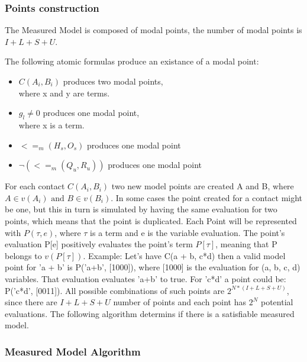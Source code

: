 \documentclass{article}
\begin{document}
		\subsubsection*{Points construction}
		The Measured Model is composed of modal points, the number of modal points is $I + L + S + U$.
		
		The following atomic formulas produce an existance of a modal point:
		\begin{itemize}
			\item $C(A_i, B_i)$ produces two modal points, \\
				where x and y are terms.
			\item $g_l \neq 0$ produces one modal point, \\
				where x is a term.
			\item $<=_m(H_s, O_s)$ produces one modal point
			\item $\neg (<=_m(Q_u, R_u) )$ produces one modal point
		\end{itemize}
		For each contact $C(A_i, B_i)$ two new model points are created A and B, where $A \in v(A_i) \text{ and } B \in v(B_i)$.
		In some cases the point created for a contact might be one, but this in turn is simulated by having the same evaluation for two 
		points, which means that the point is duplicated.
		\newline
		Each Point will be represented with $P(\tau , e)$, where $\tau$ is a term and e is the variable evaluation.
		The point's evaluation P[e] positively evaluates the point's term $P[\tau ]$, meaning that P belongs to $v(P[\tau ])$.
		\newline
		Example: Let's have C(a + b, c*d)
		\newline
		then a valid model point for 'a + b' is P('a+b', [1000]), where [1000] is the evaluation for (a, b, c, d) variables.
		That evaluation evaluates 'a+b' to true.
		\newline
		For 'c*d' a point could be: P('c*d', [0011]).
		\newline
		All possible combinations of such points are $2^{N * (I + L + S + U)}$, since there are $I + L + S + U$ number of points and 
		each point has $2^N$ potential evaluations.
		\newline
		The following algorithm determins if there is a satisfiable measured model.

		\subsubsection*{Measured Model Algorithm}
\end{document}
